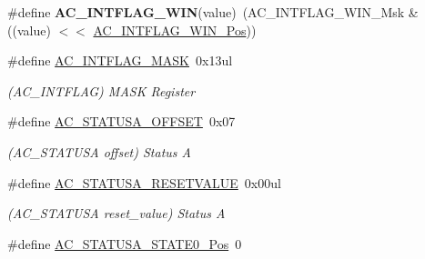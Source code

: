 \begin{DoxyCompactItemize}
\item 
\hypertarget{group___s_a_m_l21___a_c_gac21318f4582f8935a049ae81f0676e75}{}\#define {\bfseries A\+C\+\_\+\+I\+N\+T\+F\+L\+A\+G\+\_\+\+W\+I\+N}(value)~(A\+C\+\_\+\+I\+N\+T\+F\+L\+A\+G\+\_\+\+W\+I\+N\+\_\+\+Msk \& ((value) $<$$<$ \hyperlink{group___s_a_m_l21___a_c_gab8feb07a41c8519472bce0d6b09d568d}{A\+C\+\_\+\+I\+N\+T\+F\+L\+A\+G\+\_\+\+W\+I\+N\+\_\+\+Pos}))\label{group___s_a_m_l21___a_c_gac21318f4582f8935a049ae81f0676e75}

\item 
\hypertarget{group___s_a_m_l21___a_c_ga3b147673fba8c46ce42c8825d397964b}{}\#define \hyperlink{group___s_a_m_l21___a_c_ga3b147673fba8c46ce42c8825d397964b}{A\+C\+\_\+\+I\+N\+T\+F\+L\+A\+G\+\_\+\+M\+A\+S\+K}~0x13ul\label{group___s_a_m_l21___a_c_ga3b147673fba8c46ce42c8825d397964b}

\begin{DoxyCompactList}\small\item\em (A\+C\+\_\+\+I\+N\+T\+F\+L\+A\+G) M\+A\+S\+K Register \end{DoxyCompactList}\item 
\hypertarget{group___s_a_m_l21___a_c_ga7357f0e4cff320ccdcfce8cfa4446590}{}\#define \hyperlink{group___s_a_m_l21___a_c_ga7357f0e4cff320ccdcfce8cfa4446590}{A\+C\+\_\+\+S\+T\+A\+T\+U\+S\+A\+\_\+\+O\+F\+F\+S\+E\+T}~0x07\label{group___s_a_m_l21___a_c_ga7357f0e4cff320ccdcfce8cfa4446590}

\begin{DoxyCompactList}\small\item\em (A\+C\+\_\+\+S\+T\+A\+T\+U\+S\+A offset) Status A \end{DoxyCompactList}\item 
\hypertarget{group___s_a_m_l21___a_c_ga1d0c5a8f06130ee70400f50068aa162a}{}\#define \hyperlink{group___s_a_m_l21___a_c_ga1d0c5a8f06130ee70400f50068aa162a}{A\+C\+\_\+\+S\+T\+A\+T\+U\+S\+A\+\_\+\+R\+E\+S\+E\+T\+V\+A\+L\+U\+E}~0x00ul\label{group___s_a_m_l21___a_c_ga1d0c5a8f06130ee70400f50068aa162a}

\begin{DoxyCompactList}\small\item\em (A\+C\+\_\+\+S\+T\+A\+T\+U\+S\+A reset\+\_\+value) Status A \end{DoxyCompactList}\item 
\hypertarget{group___s_a_m_l21___a_c_gae23aae3cd17aca60cfa3046da6f432c0}{}\#define \hyperlink{group___s_a_m_l21___a_c_gae23aae3cd17aca60cfa3046da6f432c0}{A\+C\+\_\+\+S\+T\+A\+T\+U\+S\+A\+\_\+\+S\+T\+A\+T\+E0\+\_\+\+Pos}~0\label{group___s_a_m_l21___a_c_gae23aae3cd17aca60cfa3046da6f432c0}


\end{DoxyCompactItemize}
